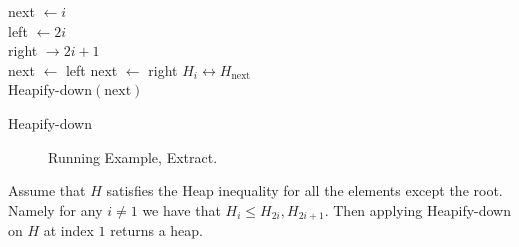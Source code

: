 \fi

\begin{algorithm}[H]
next  $\leftarrow i  $ \\
left  $\leftarrow 2i $ \\
right $\rightarrow 2i +1 $ \\ 
 {
  next $\leftarrow$ left 
}
 {
  next $\leftarrow$  right
}
 {
  $ H_{i} \leftrightarrow H_{\text{next}} $ \\ 
  Heapify-down$\left( \text{next}  \right)$
}
\caption{ Heapify-down }
\label{alg:heapify}
\end{algorithm}


\begin{figure}[h]
  \centering
  \begin{subfigure}[b]{0.23\textwidth}
	
  \end{subfigure}
\begin{subfigure}[b]{0.23\textwidth}
	
  \end{subfigure}
\begin{subfigure}[b]{0.23\textwidth}
	
  \end{subfigure}
\begin{subfigure}[b]{0.23\textwidth}
	
  \end{subfigure}
  \caption{Running Example, Extract.} 
\end{figure}


\begin{claim}
  
Assume that $H$ satisfies the Heap inequality for all the elements except the root. Namely for any $i \neq 1$ we have that $H_{i} \le H_{2i}, H_{2i+1}$. Then applying Heapify-down on $H$ at index $1$ returns a heap.  
\end{claim}

